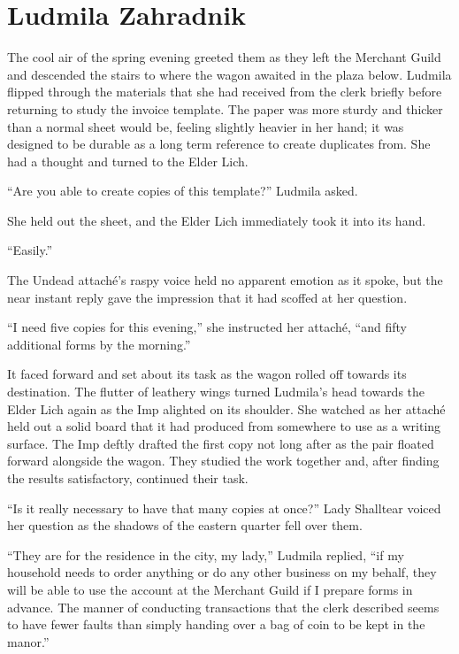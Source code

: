 \chapter{Ludmila Zahradnik}

The cool air of the spring evening greeted them as they left the Merchant Guild and descended the stairs to where the wagon awaited in the plaza below. Ludmila flipped through the materials that she had received from the clerk briefly before returning to study the invoice template. The paper was more sturdy and thicker than a normal sheet would be, feeling slightly heavier in her hand; it was designed to be durable as a long term reference to create duplicates from. She had a thought and turned to the Elder Lich.

 

“Are you able to create copies of this template?” Ludmila asked.

 

She held out the sheet, and the Elder Lich immediately took it into its hand.

 

“Easily.”

 

The Undead attaché’s raspy voice held no apparent emotion as it spoke, but the near instant reply gave the impression that it had scoffed at her question.

 

“I need five copies for this evening,” she instructed her attaché, “and fifty additional forms by the morning.”

 

It faced forward and set about its task as the wagon rolled off towards its destination. The flutter of leathery wings turned Ludmila’s head towards the Elder Lich again as the Imp alighted on its shoulder. She watched as her attaché held out a solid board that it had produced from somewhere to use as a writing surface. The Imp deftly drafted the first copy not long after as the pair floated forward alongside the wagon. They studied the work together and, after finding the results satisfactory, continued their task.

 

“Is it really necessary to have that many copies at once?” Lady Shalltear voiced her question as the shadows of the eastern quarter fell over them.

 

“They are for the residence in the city, my lady,” Ludmila replied, “if my household needs to order anything or do any other business on my behalf, they will be able to use the account at the Merchant Guild if I prepare forms in advance. The manner of conducting transactions that the clerk described seems to have fewer faults than simply handing over a bag of coin to be kept in the manor.”

